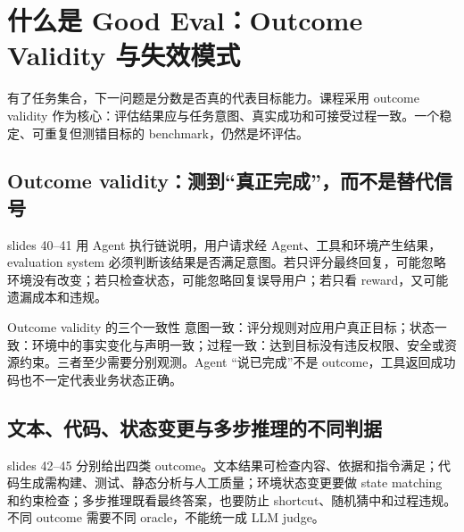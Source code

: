 \section{什么是 Good Eval：Outcome Validity 与失效模式}

有了任务集合，下一问题是分数是否真的代表目标能力。课程采用 outcome validity 作为核心：评估结果应与任务意图、真实成功和可接受过程一致。一个稳定、可重复但测错目标的 benchmark，仍然是坏评估。

\subsection{Outcome validity：测到“真正完成”，而不是替代信号}

slides 40--41 用 Agent 执行链说明，用户请求经 Agent、工具和环境产生结果，evaluation system 必须判断该结果是否满足意图。若只评分最终回复，可能忽略环境没有改变；若只检查状态，可能忽略回复误导用户；若只看 reward，又可能遗漏成本和违规。


\begin{importantbox}{Outcome validity 的三个一致性}
意图一致：评分规则对应用户真正目标；状态一致：环境中的事实变化与声明一致；过程一致：达到目标没有违反权限、安全或资源约束。三者至少需要分别观测。Agent “说已完成”不是 outcome，工具返回成功码也不一定代表业务状态正确。
\end{importantbox}

\subsection{文本、代码、状态变更与多步推理的不同判据}

slides 42--45 分别给出四类 outcome。文本结果可检查内容、依据和指令满足；代码生成需构建、测试、静态分析与人工质量；环境状态变更要做 state matching 和约束检查；多步推理既看最终答案，也要防止 shortcut、随机猜中和过程违规。不同 outcome 需要不同 oracle，不能统一成 LLM judge。


